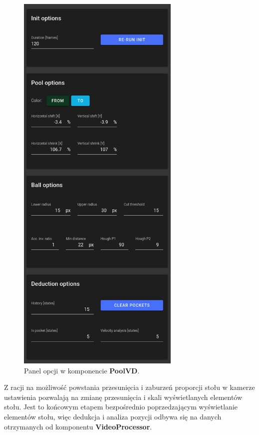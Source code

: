 \documentclass[12pt]{article}
\begin{document}
\begin{figure}[H]
    \centering
    \includegraphics[height=19cm]{./images/options.png}
    \caption{Panel opcji w komponencie \textbf{PoolVD}.}
    \label{options}
\end{figure}

Z racji na możliwość powstania przesunięcia i zaburzeń proporcji stołu w kamerze ustawienia pozwalają na zmianę przesunięcia i skali wyświetlanych elementów stołu. Jest to końcowym etapem bezpośrednio poprzedzającym wyświetlanie elementów stołu, więc dedukcja i analiza pozycji odbywa się na danych otrzymanych od komponentu \textbf{VideoProcessor}.
\end{document}
